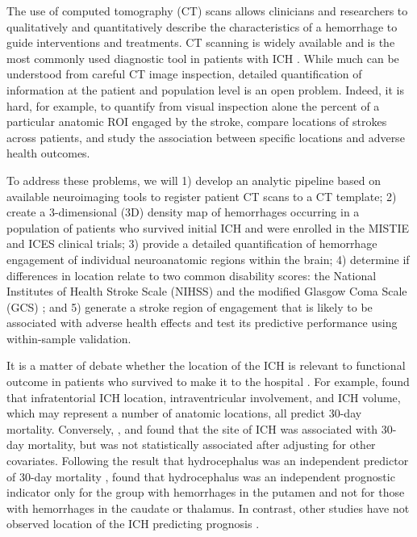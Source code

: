 \documentclass[10pt]{article}\usepackage[]{graphicx}\usepackage[]{color}
\begin{document}
The use of computed tomography (CT) scans allows clinicians and researchers to qualitatively and quantitatively describe the characteristics of a hemorrhage to guide interventions and treatments.  CT scanning is widely available and is the most commonly used diagnostic tool in patients with ICH \citep{sahni_management_2007}. While much can be understood from careful CT image inspection, detailed quantification of information at the patient and population level is an open problem. Indeed, it is hard, for example, to quantify from visual inspection alone the percent of a particular anatomic ROI engaged by the stroke, compare locations of strokes across patients, and study the association between specific locations and adverse health outcomes.

To address these problems, we will 1) develop an analytic pipeline based on available neuroimaging tools to register patient CT scans to a CT template; 2) create a 3-dimensional (3D) density map of hemorrhages occurring in a population of patients who survived initial ICH and were enrolled in the MISTIE and ICES clinical trials; 3) provide a detailed quantification of hemorrhage engagement of individual neuroanatomic regions within the brain; 4) determine if differences in location relate to two common disability scores: the National Institutes of Health Stroke Scale (NIHSS) \citep{brott_measurements_1989} 
and the modified Glasgow Coma Scale (GCS) \citep{teasdale_assessment_1974, teasdale_assessment_1976}; 
and 5) generate a stroke region of engagement that is likely to be associated with adverse health effects and test its predictive performance using within-sample validation.

It is a matter of debate whether the location of the ICH is relevant to functional outcome in patients who survived to make it to the hospital \citep{carhuapoma_intracerebral_2009}. For example, \citet{hemphill_ich_2001} found that infratentorial ICH location, intraventricular involvement, and ICH volume, which may represent a number of anatomic locations, all predict 30-day mortality. Conversely, \citet{chuang_risk_2009}, and \citet{diringer_hydrocephalus:_1998} found that the site of ICH was associated with 30-day mortality, but was not statistically associated after adjusting for other covariates.  Following the result that hydrocephalus was an independent predictor of 30-day mortality \citep{diringer_hydrocephalus:_1998}, \citet{phan_hydrocephalus_2000} found that hydrocephalus was an independent prognostic indicator only for the group with hemorrhages in the putamen and not for those with hemorrhages in the caudate or thalamus. In contrast, other studies have not observed location of the ICH predicting prognosis \citep{portenoy_intracerebral_1987, senant_[multi-factorial_1988, daverat_death_1991, broderick_volume_1993, lisk_early_1994, mase_immediate_1995, qureshi_predictors_1995, razzaq_determinants_1998, hallevy_spontaneous_2002, cheung_use_2003}.  
\end{document}

